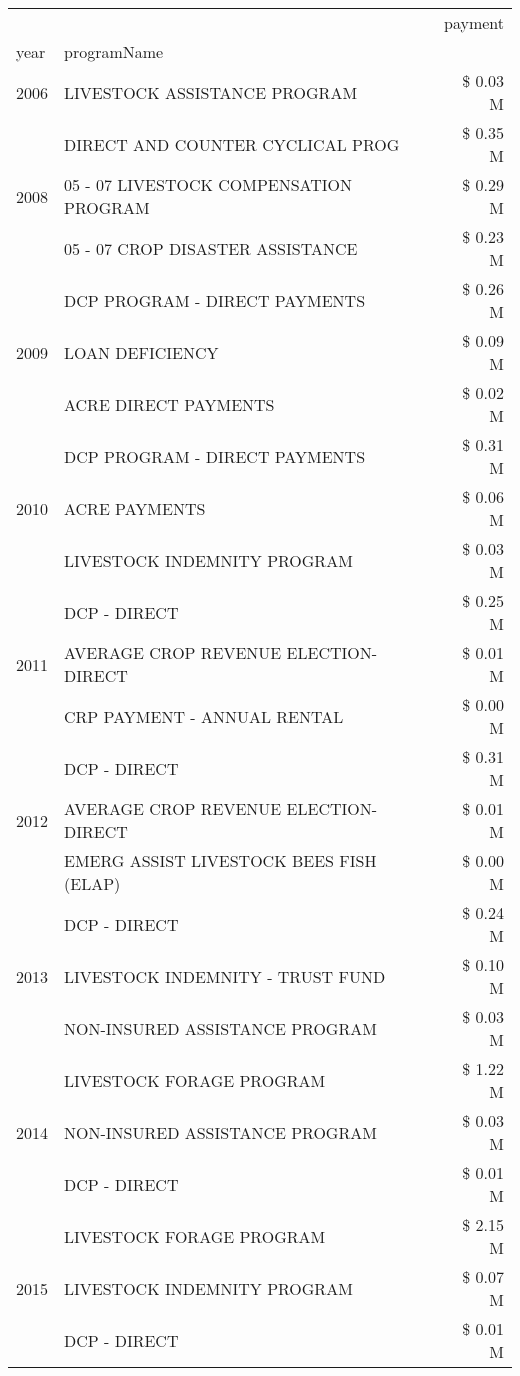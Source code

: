 \begin{tabular}{llr}
\toprule
 &  & payment \\
year & programName &  \\
\midrule
2006 & LIVESTOCK ASSISTANCE PROGRAM & \$ 0.03 M \\
\cline{1-3}
\multirow[t]{3}{*}{2008} & DIRECT AND COUNTER CYCLICAL PROG & \$ 0.35 M \\
 & 05 - 07 LIVESTOCK COMPENSATION PROGRAM & \$ 0.29 M \\
 & 05 - 07 CROP DISASTER ASSISTANCE & \$ 0.23 M \\
\cline{1-3}
\multirow[t]{3}{*}{2009} & DCP PROGRAM - DIRECT PAYMENTS & \$ 0.26 M \\
 & LOAN DEFICIENCY & \$ 0.09 M \\
 & ACRE DIRECT PAYMENTS & \$ 0.02 M \\
\cline{1-3}
\multirow[t]{3}{*}{2010} & DCP PROGRAM - DIRECT PAYMENTS & \$ 0.31 M \\
 & ACRE PAYMENTS & \$ 0.06 M \\
 & LIVESTOCK INDEMNITY PROGRAM & \$ 0.03 M \\
\cline{1-3}
\multirow[t]{3}{*}{2011} & DCP - DIRECT & \$ 0.25 M \\
 & AVERAGE CROP REVENUE ELECTION-DIRECT & \$ 0.01 M \\
 & CRP PAYMENT - ANNUAL RENTAL & \$ 0.00 M \\
\cline{1-3}
\multirow[t]{3}{*}{2012} & DCP - DIRECT & \$ 0.31 M \\
 & AVERAGE CROP REVENUE ELECTION-DIRECT & \$ 0.01 M \\
 & EMERG ASSIST LIVESTOCK BEES FISH (ELAP) & \$ 0.00 M \\
\cline{1-3}
\multirow[t]{3}{*}{2013} & DCP - DIRECT & \$ 0.24 M \\
 & LIVESTOCK INDEMNITY - TRUST FUND & \$ 0.10 M \\
 & NON-INSURED ASSISTANCE PROGRAM & \$ 0.03 M \\
\cline{1-3}
\multirow[t]{3}{*}{2014} & LIVESTOCK FORAGE PROGRAM & \$ 1.22 M \\
 & NON-INSURED ASSISTANCE PROGRAM & \$ 0.03 M \\
 & DCP - DIRECT & \$ 0.01 M \\
\cline{1-3}
\multirow[t]{3}{*}{2015} & LIVESTOCK FORAGE PROGRAM & \$ 2.15 M \\
 & LIVESTOCK INDEMNITY PROGRAM & \$ 0.07 M \\
 & DCP - DIRECT & \$ 0.01 M \\
\cline{1-3}

\end{tabular}
